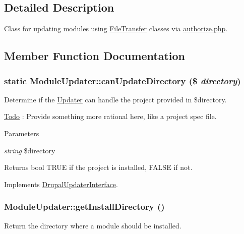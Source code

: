 \subsection{Detailed Description}
Class for updating modules using \hyperlink{classFileTransfer}{FileTransfer} classes via \hyperlink{authorize_8php}{authorize.php}. 

\subsection{Member Function Documentation}
\hypertarget{classModuleUpdater_a7bd09734a00297f3c1802d8eece33ed7}{
\subsubsection[{canUpdateDirectory}]{\setlength{\rightskip}{0pt plus 5cm}static ModuleUpdater::canUpdateDirectory (\$ {\em directory})}}
\label{classModuleUpdater_a7bd09734a00297f3c1802d8eece33ed7}
Determine if the \hyperlink{classUpdater}{Updater} can handle the project provided in \$directory.

\begin{Desc}
\item[\hyperlink{todo__todo000008}{Todo}]: Provide something more rational here, like a project spec file.\end{Desc}

\begin{DoxyParams}{Parameters}
\item[{\em string}]\$directory\end{DoxyParams}
\begin{DoxyReturn}{Returns}
bool TRUE if the project is installed, FALSE if not. 
\end{DoxyReturn}


Implements \hyperlink{interfaceDrupalUpdaterInterface_a3ff6c92f6ed593e03f5e36788ef2d2cc}{DrupalUpdaterInterface}.\hypertarget{classModuleUpdater_a8c7efff0795d79e256cab15be533800d}{
\subsubsection[{getInstallDirectory}]{\setlength{\rightskip}{0pt plus 5cm}ModuleUpdater::getInstallDirectory ()}}
\label{classModuleUpdater_a8c7efff0795d79e256cab15be533800d}
Return the directory where a module should be installed.

